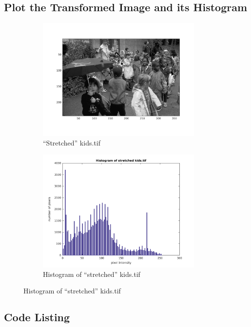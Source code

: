 \documentclass{article}
\begin{document}
\subsection{Plot the Transformed Image and its Histogram}
	\begin{figure}[h]
		\begin{subfigure}{0.5\textwidth}
			\includegraphics[width=0.9\textwidth]{kids_str.png}
			\caption{``Stretched'' kids.tif}
		\end{subfigure}
		\begin{subfigure}{0.5\textwidth}
			\includegraphics[width=0.9\textwidth]{kids_str_hist.png}
			\caption{Histogram of ``stretched'' kids.tif}
		\end{subfigure}
	\end{figure}

\subsection{Code Listing}
\end{document}
